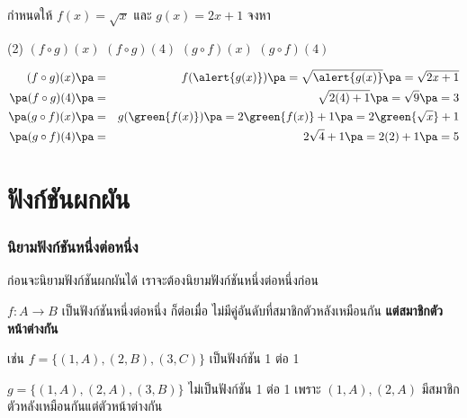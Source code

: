 \begin{frame}[t]
\begin{ex}
กำหนดให้ $f(x) = \sqrt{x} $ และ $g(x) = 2x+1$ จงหา 
\begin{tasks}(2)
\task $(f \circ g)(x)$
\task $(f \circ g)(4)$
\task $(g \circ f)(x)$
\task $(g \circ f)(4)$
\end{tasks}
\end{ex}
\begin{sol}
\begin{eqnarray*}
(f \circ g)(x) \pa &=& f(\alert{g(x)}) \pa= \sqrt{\alert{g(x)}} \pa = \sqrt{2x+1} \\ \pa
(f \circ g)(4) \pa &=& \sqrt{2(4) + 1 } \pa = \sqrt{9} \pa = 3 \\ \pa
(g \circ f)(x) \pa &=& g(\green{f(x)}) \pa = 2\green{f(x)}+1 \pa = 2\green{\sqrt{x}} + 1 \\ \pa
(g \circ f)(4) \pa &=& 2\sqrt{4} + 1 \pa =  2(2) + 1 \pa = 5
\end{eqnarray*}
\end{sol}
\end{frame}

\section{ฟังก์ชันผกผัน}
\frame{\sectionpage}

\begin{frame}
\frametitle{นิยามฟังก์ชันหนึ่งต่อหนึ่ง}
ก่อนจะนิยามฟังก์ชันผกผันได้ เราจะต้องนิยามฟังก์ชันหนึ่งต่อหนึ่งก่อน
\begin{defn}{}{}
$f: A \rightarrow B$ เป็นฟังก์ชันหนึ่งต่อหนึ่ง ก็ต่อเมื่อ ไม่มีคู่อันดับที่สมาชิกตัวหลังเหมือนกัน \textbf{แต่สมาชิกตัวหน้าต่างกัน}
\end{defn} \pa

เช่น $f = \{ (1,A), (2,B), (3,C)\}$ เป็นฟังก์ชัน 1 ต่อ 1 \pa

$g = \{(1,A), (2,A), (3,B)\}$ ไม่เป็นฟังก์ชัน 1 ต่อ 1 เพราะ $(1,A), (2,A)$ มีสมาชิกตัวหลังเหมือนกันแต่ตัวหน้าต่างกัน \pa
\end{frame}


